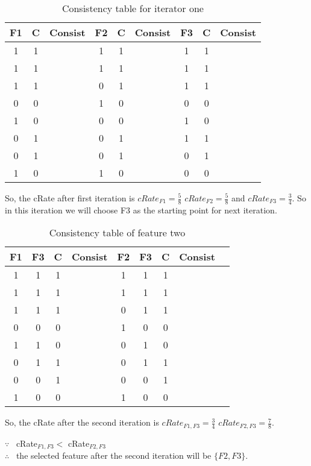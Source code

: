 \documentclass{article}
\newcommand{\tickYes}{\checkmark}
\newcommand{\tickNo}{\hspace{1pt}\ding{55}}
\begin{document}
\begin{enumerate}
\begin{table}[ht]
  \begin{center}
    \begin{tabular}{| c | c | c || c | c | c || c | c | c |}
      \hline F1 & C & Consist & F2 & C & Consist & F3 & C & Consist \\
      \hline 1 & 1 & \tickYes & 1 & 1 & \tickYes & 1 & 1 & \tickYes \\
      \hline 1 & 1 & \tickYes & 1 & 1 & \tickYes & 1 & 1 & \tickYes \\
      \hline 1 & 1 & \tickYes & 0 & 1 & \tickYes & 1 & 1 & \tickYes \\
      \hline 0 & 0 & \tickNo  & 1 & 0 & \tickNo  & 0 & 0 & \tickYes \\
      \hline 1 & 0 & \tickNo  & 0 & 0 & \tickNo  & 1 & 0 & \tickNo  \\
      \hline 0 & 1 & \tickYes & 0 & 1 & \tickYes & 1 & 1 & \tickYes \\
      \hline 0 & 1 & \tickYes & 0 & 1 & \tickYes & 0 & 1 & \tickNo  \\
      \hline 1 & 0 & \tickNo  & 1 & 0 & \tickNo  & 0 & 0 & \tickYes \\
      \hline 
    \end{tabular}
    \caption{Consistency table for iterator one}
  \end{center}
\end{table}
So, the cRate after first iteration is $cRate_{F1}=\frac{5}{8}$
$cRate_{F2}=\frac{5}{8}$ and $cRate_{F3}=\frac{3}{4}$. So in this iteration
we will choose F3 as the starting point for next iteration. 

\begin{table}[ht]
  \begin{center}
    \begin{tabular}{| c | c | c || c | c | c || c | c | c |}
      \hline F1 & F3 & C & Consist & F2 & F3 & C & Consist \\
      \hline 1 & 1 & 1 & \tickYes & 1 & 1 & 1 & \tickYes \\
      \hline 1 & 1 & 1 & \tickYes & 1 & 1 & 1 & \tickYes \\
      \hline 1 & 1 & 1 & \tickYes & 0 & 1 & 1 & \tickYes \\
      \hline 0 & 0 & 0 & \tickNo  & 1 & 0 & 0 & \tickYes \\
      \hline 1 & 1 & 0 & \tickNo  & 0 & 1 & 0 & \tickNo  \\
      \hline 0 & 1 & 1 & \tickYes & 0 & 1 & 1 & \tickYes \\
      \hline 0 & 0 & 1 & \tickYes & 0 & 0 & 1 & \tickYes \\
      \hline 1 & 0 & 0 & \tickYes & 1 & 0 & 0 & \tickYes \\
      \hline 
    \end{tabular}
    \caption{Consistency table of feature two}
  \end{center}
\end{table}
So, the cRate after the second iteration is $cRate_{F1,F3}=\frac{3}{4}$
$cRate_{F2,F3}=\frac{7}{8}$. 

$\because$~ cRate$_{F1,F3} < $ cRate$_{F2,F3}$ \\
$\therefore$~ the selected feature after the second iteration will be
$\{F2,F3\}$. 
\end{enumerate}
\end{document}
